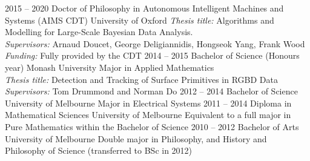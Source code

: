 \documentclass[9pt]{developercv} %
\begin{document}


\begin{entrylist}
  \entry
    {2015 -- 2020}
    {Doctor of Philosophy in Autonomous Intelligent Machines and Systems (AIMS CDT)}
    {University of Oxford}
    {\textit{Thesis title:} Algorithms and Modelling for Large-Scale Bayesian Data Analysis. \\
    \textit{Supervisors:} Arnaud Doucet, George Deligiannidis, Hongseok Yang, Frank Wood \\
    \textit{Funding:} Fully provided by the CDT
    }
  \entry
    {2014 -- 2015}
    {Bachelor of Science (Honours year)}
    {Monash University}
    {Major in Applied Mathematics \\
    \textit{Thesis title:} Detection and Tracking of Surface Primitives in RGBD Data\\
    \textit{Supervisors:} Tom Drummond and Norman Do}
  \entry
    {2012 -- 2014}
    {Bachelor of Science}
    {University of Melbourne}
    {Major in Electrical Systems}
  \entry
    {2011 -- 2014}
    {Diploma in Mathematical Sciences }
    {University of Melbourne}
    {Equivalent to a full major in Pure Mathematics within the Bachelor of Science}
  \entry
    {2010 -- 2012}
    {Bachelor of Arts}
    {University of Melbourne}
    {Double major in Philosophy, and History and Philosophy of Science (transferred to BSc in 2012)}
\end{entrylist}





\end{document}
